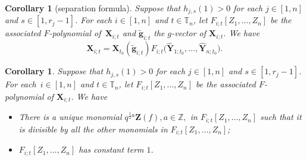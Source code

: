 \documentclass[pdftex]{sigma}
\numberwithin{equation}{section}
\newtheorem{Corollary}[Theorem]{Corollary}
\begin{document}
\begin{Corollary}[separation formula]\label{c:separation-formula}
Suppose that $h_{j,s}(1)>0$ for each $j\in [1,n]$ and $s\in [1,r_j-1]$. For each $i\in [1,n]$ and $t\in \mathbb{T}_n$, let $F_{i;t}[Z_1,\dots, Z_n]$ be the associated $F$-polynomial of~$\mathbf{X}_{i;t}$ and $\tilde{\mathbf{g}}_{i;t}$ the $g$-vector of $\mathbf{X}_{i;t}$. We have
\[\mathbf{X}_{i;t}=\mathbf{X}_{t_0}(\mathbf{\tilde{g}}_{i;t})F_{i;t}\bigl(\mathbf{\hat{Y}}_{1;t_{0}},\dots,\mathbf{\hat{Y}}_{n;t_{0}}\bigr).\]
\end{Corollary}
\begin{Corollary}\label{c:constant-term-1}
 Suppose that $h_{j,s}(1)>0$ for each $j\in [1,n]$ and $s\in [1,r_j-1]$. For each~${i\in [1,n]}$ and $t\in \mathbb{T}_n$, let $F_{i;t}[Z_1,\dots, Z_n]$ be the associated $F$-polynomial of $\mathbf{X}_{i;t}$. We have
\begin{itemize}\itemsep=0pt
 \item[$(1)$] There is a unique monomial $q^{\frac{1}{2}a}\mathbf{Z}(f),a\in\mathbb{Z},$ in $F_{i;t}[Z_1,\dots, Z_n]$ such that it is divisible by all the other monomials in $F_{i;t}[Z_1,\dots, Z_n]$;
 \item[$(2)$] $F_{i;t}[Z_1,\dots, Z_n]$ has constant term $1$.
\end{itemize}
\end{Corollary}
\end{document}
